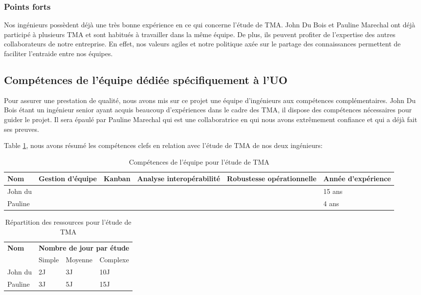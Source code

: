 	\subsubsection{Points forts}
	Nos ingénieurs possèdent déjà une très bonne expérience en ce qui concerne l’étude de TMA. John Du Bois et Pauline Marechal ont déjà participé à plusieurs TMA et sont habitués à travailler dans la même équipe. De plus, ils peuvent profiter de l’expertise des autres collaborateurs de notre entreprise. En effet, nos valeurs agiles et notre politique axée sur le partage des connaissances permettent de faciliter l’entraide entre nos équipes.
	
	\subsection{Compétences de l'équipe dédiée spécifiquement à l'UO}
	Pour assurer une prestation de qualité, nous avons mis sur ce projet une équipe d’ingénieurs aux compétences complémentaires. John Du Bois étant un ingénieur senior ayant acquis beaucoup d’expériences dans le cadre des TMA, il dispose des compétences nécessaires pour guider le projet. Il sera épaulé par Pauline Marechal qui est une collaboratrice en qui nous avons extrêmement confiance et qui a déjà fait ses preuves.
	
	Table \ref{table:competences1}, nous avons résumé les compétences clefs en relation avec l’étude de TMA de nos deux ingénieurs:
	
	\begin{table}[H]
			\centering
	\begin{tabular}{|p{3cm}|p{1.8cm}|c|p{3cm}|p{3cm}|p{3cm}|}
		\hline
		\textbf{Nom} & \textbf{Gestion d'équipe} & \textbf{Kanban} & \textbf{Analyse interopérabilité} & \textbf{Robustesse opérationnelle} & \textbf{Année d'expérience}\\
		\hline
		John du \bsc{Bois} & \checkmark & \checkmark &\checkmark  & & 15 ans\\
		\hline
		Pauline \bsc{Marechal} & &\checkmark  & &\checkmark  & 4 ans\\
		\hline
	\end{tabular}
	\caption{Compétences de l'équipe pour l'étude de TMA}
	\label{table:competences1}
	\end{table}
	
		\begin{table}[H]
			\centering
\begin{tabular}{|p{3cm}|p{3cm}|p{3cm}|p{3cm}|}
	\hline
\multirow{2}{*}{\textbf{Nom}}&\multicolumn{3}{c|}{\textbf{Nombre de jour par étude}}\\ 
\cline{2-4}
& Simple & Moyenne & Complexe \\ 
	\hline John du \bsc{Bois} & 2J & 3J & 10J \\ 
	\hline Pauline \bsc{Marechal} & 3J & 5J & 15J \\ 
	\hline 
\end{tabular} 
			\caption{Répartition des ressources pour l'étude de TMA}
			\label{table:ressources1}
		\end{table}
